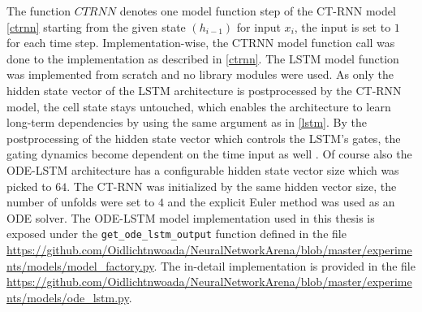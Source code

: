 \documentclass[draft,final]{vutinfth} %
\begin{document}
    The function $CTRNN$ denotes one model function step of the CT-RNN model \ref{ctrnn} starting from the given state $(h_{i-1})$ for input $x_i$, the input is set to $1$ for each time step.
    Implementation-wise, the CTRNN model function call was done to the implementation as described in \ref{ctrnn}.
    The LSTM model function was implemented from scratch and no library modules were used. 
    As only the hidden state vector of the LSTM architecture is postprocessed by the CT-RNN model, the cell state stays untouched, which enables the architecture to learn long-term dependencies by using the same argument as in \ref{lstm}.
    By the postprocessing of the hidden state vector which controls the LSTM's gates, the gating dynamics become dependent on the time input as well \cite[p. 4]{ODELSTM}.
    Of course also the ODE-LSTM architecture has a configurable hidden state vector size which was picked to $64$.
    The CT-RNN was initialized by the same hidden vector size, the number of unfolds were set to $4$ and the explicit Euler method was used as an ODE solver.
    The ODE-LSTM model implementation used in this thesis is exposed under the \texttt{get\_ode\_lstm\_output} function defined in the file \url{https://github.com/Oidlichtnwoada/NeuralNetworkArena/blob/master/experiments/models/model_factory.py}.
    The in-detail implementation is provided in the file \url{https://github.com/Oidlichtnwoada/NeuralNetworkArena/blob/master/experiments/models/ode_lstm.py}.
\end{document}
